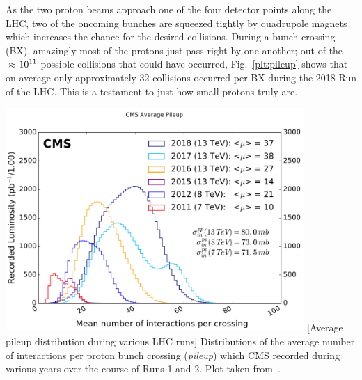 As the two proton beams approach one of the four detector points along the LHC, two of the oncoming bunches are squeezed tightly by quadrupole magnets which increases the chance for the desired \pp collisions.
During a bunch crossing (BX), amazingly most of the protons just pass right by one another; 
out of the $\approx$$\text{10}^\text{11}$ possible \pp collisions that could have occurred, Fig.~\ref{plt:pileup} shows that on average only approximately 32 collisions occurred per BX during the 2018 Run of the LHC. %
This is a testament to just how small protons truly are.
\begin{multiFigure}
    \centering
        \includegraphics[width=0.85\textwidth,keepaspectratio]{figures/lhc/pileup_allYears.pdf}
        [Average pileup distribution during various LHC runs]
        {Distributions of the average number of \pp interactions per proton bunch crossing (\emph{pileup}) which CMS recorded during various years over the course of Runs 1 and 2.
        Plot taken from~\cite{pileup}.} 
    \label{plt:pileup}
\end{multiFigure}


